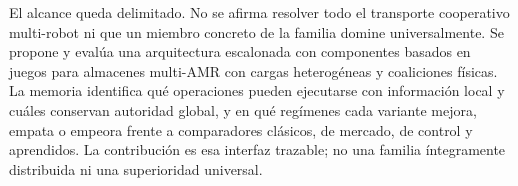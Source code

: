 El alcance queda delimitado. No se afirma resolver todo el transporte
cooperativo multi-robot ni que un miembro concreto de la familia domine universalmente.
Se propone y evalúa una arquitectura escalonada con componentes basados en juegos para
almacenes multi-AMR con cargas heterogéneas y coaliciones físicas. La memoria identifica
qué operaciones pueden ejecutarse con información local y cuáles conservan autoridad
global, y en qué regímenes cada variante mejora, empata o empeora frente a comparadores
clásicos, de mercado, de control y aprendidos. La contribución es esa interfaz trazable;
no una familia íntegramente distribuida ni una superioridad universal.
